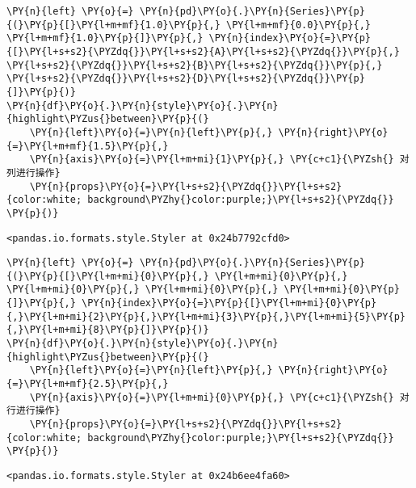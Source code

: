     \begin{tcolorbox}[breakable, size=fbox, boxrule=1pt, pad at break*=1mm,colback=cellbackground, colframe=cellborder]
\begin{Verbatim}[commandchars=\\\{\}]
\PY{n}{left} \PY{o}{=} \PY{n}{pd}\PY{o}{.}\PY{n}{Series}\PY{p}{(}\PY{p}{[}\PY{l+m+mf}{1.0}\PY{p}{,} \PY{l+m+mf}{0.0}\PY{p}{,} \PY{l+m+mf}{1.0}\PY{p}{]}\PY{p}{,} \PY{n}{index}\PY{o}{=}\PY{p}{[}\PY{l+s+s2}{\PYZdq{}}\PY{l+s+s2}{A}\PY{l+s+s2}{\PYZdq{}}\PY{p}{,} \PY{l+s+s2}{\PYZdq{}}\PY{l+s+s2}{B}\PY{l+s+s2}{\PYZdq{}}\PY{p}{,} \PY{l+s+s2}{\PYZdq{}}\PY{l+s+s2}{D}\PY{l+s+s2}{\PYZdq{}}\PY{p}{]}\PY{p}{)}
\PY{n}{df}\PY{o}{.}\PY{n}{style}\PY{o}{.}\PY{n}{highlight\PYZus{}between}\PY{p}{(}
    \PY{n}{left}\PY{o}{=}\PY{n}{left}\PY{p}{,} \PY{n}{right}\PY{o}{=}\PY{l+m+mf}{1.5}\PY{p}{,} 
    \PY{n}{axis}\PY{o}{=}\PY{l+m+mi}{1}\PY{p}{,} \PY{c+c1}{\PYZsh{} 对列进行操作}
    \PY{n}{props}\PY{o}{=}\PY{l+s+s2}{\PYZdq{}}\PY{l+s+s2}{color:white; background\PYZhy{}color:purple;}\PY{l+s+s2}{\PYZdq{}}
\PY{p}{)}
\end{Verbatim}
\end{tcolorbox}

            \begin{tcolorbox}[breakable, size=fbox, boxrule=.5pt, pad at break*=1mm, opacityfill=0]
\begin{Verbatim}[commandchars=\\\{\}]
<pandas.io.formats.style.Styler at 0x24b7792cfd0>
\end{Verbatim}
\end{tcolorbox}
        
    \begin{tcolorbox}[breakable, size=fbox, boxrule=1pt, pad at break*=1mm,colback=cellbackground, colframe=cellborder]
\begin{Verbatim}[commandchars=\\\{\}]
\PY{n}{left} \PY{o}{=} \PY{n}{pd}\PY{o}{.}\PY{n}{Series}\PY{p}{(}\PY{p}{[}\PY{l+m+mi}{0}\PY{p}{,} \PY{l+m+mi}{0}\PY{p}{,} \PY{l+m+mi}{0}\PY{p}{,} \PY{l+m+mi}{0}\PY{p}{,} \PY{l+m+mi}{0}\PY{p}{]}\PY{p}{,} \PY{n}{index}\PY{o}{=}\PY{p}{[}\PY{l+m+mi}{0}\PY{p}{,}\PY{l+m+mi}{2}\PY{p}{,}\PY{l+m+mi}{3}\PY{p}{,}\PY{l+m+mi}{5}\PY{p}{,}\PY{l+m+mi}{8}\PY{p}{]}\PY{p}{)}
\PY{n}{df}\PY{o}{.}\PY{n}{style}\PY{o}{.}\PY{n}{highlight\PYZus{}between}\PY{p}{(}
    \PY{n}{left}\PY{o}{=}\PY{n}{left}\PY{p}{,} \PY{n}{right}\PY{o}{=}\PY{l+m+mf}{2.5}\PY{p}{,} 
    \PY{n}{axis}\PY{o}{=}\PY{l+m+mi}{0}\PY{p}{,} \PY{c+c1}{\PYZsh{} 对行进行操作}
    \PY{n}{props}\PY{o}{=}\PY{l+s+s2}{\PYZdq{}}\PY{l+s+s2}{color:white; background\PYZhy{}color:purple;}\PY{l+s+s2}{\PYZdq{}}
\PY{p}{)}
\end{Verbatim}
\end{tcolorbox}

            \begin{tcolorbox}[breakable, size=fbox, boxrule=.5pt, pad at break*=1mm, opacityfill=0]
\begin{Verbatim}[commandchars=\\\{\}]
<pandas.io.formats.style.Styler at 0x24b6ee4fa60>
\end{Verbatim}
\end{tcolorbox}